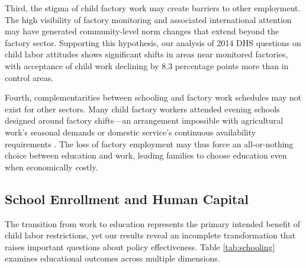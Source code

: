 \documentclass[12pt]{article}
\begin{document}
Third, the stigma of child factory work may create barriers to other employment. The high visibility of factory monitoring and associated international attention may have generated community-level norm changes that extend beyond the factory sector. Supporting this hypothesis, our analysis of 2014 DHS questions on child labor attitudes shows significant shifts in areas near monitored factories, with acceptance of child work declining by 8.3 percentage points more than in control areas.

Fourth, complementarities between schooling and factory work schedules may not exist for other sectors. Many child factory workers attended evening schools designed around factory shifts—an arrangement impossible with agricultural work's seasonal demands or domestic service's continuous availability requirements \citep{khan2007child}. The loss of factory employment may thus force an all-or-nothing choice between education and work, leading families to choose education even when economically costly.


\subsection{School Enrollment and Human Capital}

The transition from work to education represents the primary intended benefit of child labor restrictions, yet our results reveal an incomplete transformation that raises important questions about policy effectiveness. Table \ref{tab:schooling} examines educational outcomes across multiple dimensions.
\end{document}
